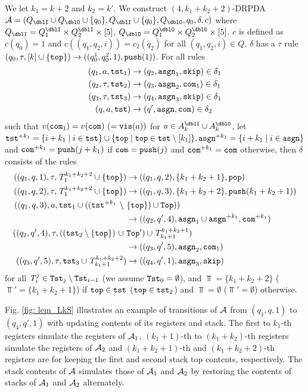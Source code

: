 We let $k_1=k+2$ and $k_2=k'$.
We construct $(4,k_1+k_2+2)$-DRPDA
$\calA=(Q_\dblI\cup Q_\dblO\cup\{q_0\}, Q_\dblI\cup\{q_0\}, Q_\dblO, q_0, \delta, c)$
where $Q_\dblI=Q^\dblI_1\times Q^\dblI_2\times[5]$,
$Q_\dblO=Q^\dblO_1\times Q^\dblO_2\times[5]$.
$c$ is defined as $c(q_0)=1$ and
$c((q_1,q_2,i))=c_2(q_2)$ for all $(q_1,q_2,i)\in Q$.
$\delta$ has a $\tau$ rule $(q_0,\tau,[k]\cup\{\mathtt{top}\})\to((q^1_0, q^2_0,1), \mathtt{push}(1))$.
For all rules
\begin{align}
(q_1, a, \mathtt{tst}_1) &\to (q_2,\mathtt{asgn}_1, \mathtt{skip})\in\delta_1\label{eq: LkS1}\\
(q_2, \tau, \mathtt{tst}_2) &\to (q_3,\mathtt{asgn}_2, \mathtt{com}_1)\in\delta_1\label{eq: LkS2}\\
(q_3, \tau, \mathtt{tst}_3) &\to (q_4,\mathtt{asgn}_3, \mathtt{skip})\in\delta_1\label{eq: LkS3}\\
(q, a, \mathtt{tst}) &\to (q',\mathtt{asgn}, \mathtt{com})\in\delta_2\label{eq: LkS4}
\end{align}
such that $v(\mathtt{com}_1)=v(\mathtt{com})\ (=\mathtt{vis}(a))$ for $a\in A^\dblI_{k}\cup A^\dblO_{k}$,
let $\mathtt{tst}^{+ k_1}=\{i+k_1\mid i\in\mathtt{tst}\}\cup\{\mathtt{top}\mid\mathtt{top}\in\mathtt{tst}\setminus[k_1]\}, \mathtt{asgn}^{+ k_1}=\{i+k_1\mid i\in\mathtt{asgn}\}$ and $\mathtt{com}^{+ k_1} = \mathtt{push}(j+k_1)$ if $\mathtt{com}=\mathtt{push}(j)$ and $\mathtt{com}^{+ k_1} = \mathtt{com}$ otherwise, then $\delta$ consists of the rules
\begin{align}
((q_1, q, 1), \tau, \T^{k_1+k_2+2}_{1}\cup\{\top\}) &\to ((q_1, q, 2), \{k_1+k_2+1\}, \pop)\label{eq: LkS5}\\
((q_1, q, 2), \tau, \T^{k_1+k_2+2}_{1}\cup\{\top\})&\to ((q_1, q, 3), \{k_1+k_2+2\}, \push(k_1+k_2+1)) \label{eq: LkS6}\\
((q_1, q, 3), a,
\tst_1\cup ((\tst^{+ k_1}\ \setminus\ &\{\top\})\cup\Top))\nonumber\\
&\to ((q_2, q', 4), \asgn_1\cup\asgn^{+ k_1}, \com^{+ k_1})\label{eq: LkS7}\\
((q_2, q', 4), \tau,((\tst_2\setminus\{\top\})\ \cup\ &\Top')\cup\T^{k_1+k_2+1}_{k_1+1})\nonumber\\
&\to ((q_3, q', 5), \asgn_2, \com_1)\label{eq: LkS8}\\
((q_3, q', 5), \tau, \tst_3\cup\T^{k_1+k_2+2}_{k_1+1}) &\to ((q_4, q', 1), \asgn_3, \skip)\label{eq: LkS9}
\end{align}
for all $\mathit{T}^{j}_{i}\in\mathtt{Tst}_{j}\setminus\mathtt{Tst}_{i-1}$ (we assume $\mathtt{Tst}_0=\emptyset$), and
$\Top=\{k_1+k_2+2\}$ ($\Top'=\{k_1+k_2+1\}$) if $\mathtt{top}\in\mathtt{tst}$ ($\mathtt{top}\in\mathtt{tst}_2$) and $\Top=\emptyset$ ($\Top'=\emptyset$) otherwise.

Fig. \ref{fig: lem_LkS} illustrates an example of transitions of ${\cal A}$
from $(q_1,q,1)$ to $(q_4,q',1)$ with updating
contents of its registers and stack.
The first to $k_1$-th registers simulate
the registers of ${\cal A}_1$,
$(k_1+1)$-th to $(k_1+k_2)$-th registers simulate
the registers of ${\cal A}_2$ and
$(k_1+k_2+1)$-th and $(k_1+k_2+2)$-th registers
are for keeping the first and second stack top contents, respectively.
The stack contents of ${\cal A}$ simulates those of ${\cal A}_1$ and ${\cal A}_2$ by restoring the contents of stacks of ${\cal A}_1$ and ${\cal A}_2$ alternately.

